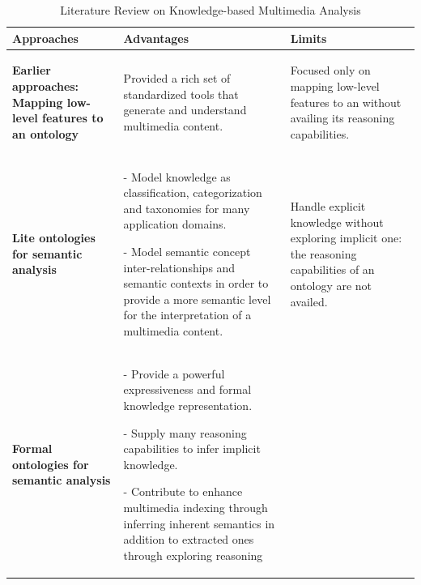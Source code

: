 		\begin{table}
			\footnotesize
			\centering
			\caption{Literature Review on Knowledge-based Multimedia Analysis}
			\begin{tabular}{p{4.7cm}  p{4.7cm}p{4.7cm}}
				\textbf{\sffamily Approaches} & \textbf{\sffamily Advantages} & \textbf{\sffamily Limits} \\  \hline
				\begin{flushleft} {\textbf{Earlier approaches: Mapping low-level features to an ontology}} \end{flushleft}
				& \begin{flushleft} Provided a rich set of standardized tools that generate 
					and understand multimedia content.\end{flushleft}
				& \begin{flushleft} Focused only on mapping low-level features to an \revAnglais{ontology} 
					without availing its reasoning capabilities.\end{flushleft} \\
				\begin{flushleft} {\textbf{Lite ontologies for semantic analysis}} \end{flushleft}
				&  \begin{flushleft} - Model knowledge as classification, categorization and 
					taxonomies for many application domains. \par
				   - Model semantic concept inter-relationships and semantic contexts 
					in order to provide a more semantic level for the interpretation of
					a multimedia content.\end{flushleft}
				&  \begin{flushleft} Handle explicit knowledge without exploring implicit one: the reasoning 
					capabilities of an ontology are not availed.\end{flushleft}\\
				\begin{flushleft} {\textbf{Formal ontologies for semantic analysis }} \end{flushleft}
				& \begin{flushleft}- Provide a powerful expressiveness and formal knowledge representation. \par
				  - Supply many reasoning capabilities to infer implicit knowledge. \par
				  - Contribute to enhance multimedia indexing through inferring inherent 
					semantics in addition to extracted ones through exploring reasoning 

\end{flushleft}
\end{tabular}
\end{table}
